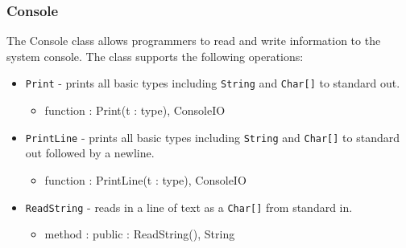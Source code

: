 \documentclass[12pt]{article}
\begin{document}
\subsubsection{Console}
The Console class allows programmers to read and write information to the system console.    The class supports the following operations:
\begin{itemize}
\item 
  \texttt{Print} - prints all basic types including
  \texttt{String} and \texttt{Char[]} to standard out.
  \begin{itemize}
  \item function : Print(t : type), ConsoleIO
  \end{itemize}
\item \texttt{PrintLine} - prints all basic types including
  \texttt{String} and \texttt{Char[]} to standard out followed by a
  newline.
  \begin{itemize}
  \item function : PrintLine(t : type), ConsoleIO
  \end{itemize}
\item \texttt{ReadString} - reads in a line of text as a \texttt{Char[]} from standard in.
  \begin{itemize}
  \item method : public : ReadString(), String
  \end{itemize}
\end{itemize}
\end{document}
